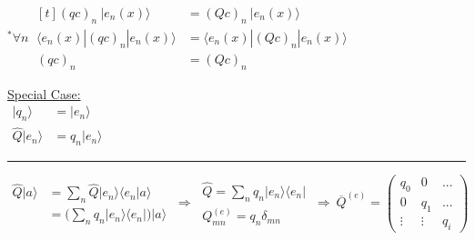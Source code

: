 \documentclass[12pt]{article}
\begin{document}
\begin{minipage}[t]{.4\textwidth}
    \scriptsize
    \vspace{10pt}
    \(^* \forall {\scriptstyle n}\ \begin{aligned}[t]
        (q c)_n \ | e_n{\scriptstyle(x)} \rangle &= (Q c)_n \ | e_n{\scriptstyle(x)} \rangle\\[5pt]
        \langle e_n{\scriptstyle(x)} | (q c)_n | e_n{\scriptstyle(x)} \rangle 
            &= \langle e_n{\scriptstyle(x)} | (Q c)_n | e_n{\scriptstyle(x)} \rangle\\
        (q c)_n &= (Q c)_n
    \end{aligned}\)
\end{minipage}

\vspace{15pt} \noindent
\underline{Special Case:}\\[10pt]
\( \begin{aligned}
    | q_n \rangle &= | e_n \rangle\\[5pt]
    \widehat{Q} | e_n \rangle &= q_n | e_n \rangle
\end{aligned} \) 
\hspace{5pt}
\rule[-30pt]{.5pt}{67pt}
\hspace{10pt}
\( 
    \begin{aligned}
        \widehat{Q} | a \rangle &= \sum_n \widehat{Q} | e_n \rangle \langle e_n | a \rangle\\
        &= \Big( \sum_n q_n | e_n \rangle \langle e_n | \Big) | a \rangle
    \end{aligned} 
    \ \Rightarrow \ 
    \begin{gathered}
        \boxed{ \widehat{Q} = \sum_n q_n | e_n \rangle \langle e_n | } \\[5pt]
        Q_{mn}^{(e)} = q_n \delta_{mn}
    \end{gathered}
    \ \Rightarrow \
    \boxed{
        \overline{Q}^{(e)} = 
        \left(\begin{matrix} 
            q_0     & 0         & ...\\
            0       & q_1       & ...\\
            \vdots  & \vdots    & q_i
        \end{matrix}\right)
    }
\) 
\end{document}
